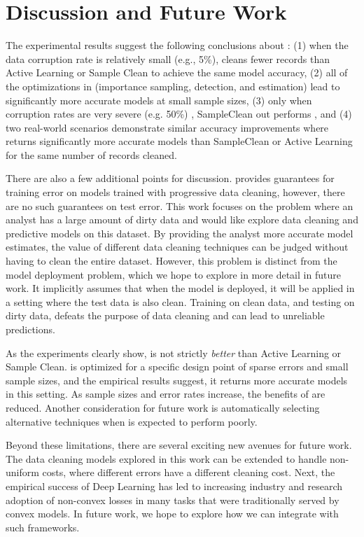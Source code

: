 \section{Discussion and Future Work}
The experimental results suggest the following conclusions about \sys: (1) when the data corruption rate is relatively small (e.g., 5\%), \sys cleans fewer records than Active Learning or Sample Clean to achieve the same model accuracy, (2) all of the optimizations in \sys (importance sampling, detection, and estimation) lead to significantly more accurate models at small sample sizes, (3) only when corruption rates are very severe (e.g. 50\%) , SampleClean out performs \sys, and (4) two real-world scenarios demonstrate similar accuracy improvements where \sys returns significantly more accurate models than SampleClean or Active Learning for the same number of records cleaned.

There are also a few additional points for discussion.
\sys provides guarantees for training error on models trained with progressive data cleaning, however, there are no such guarantees on test error. 
This work focuses on the problem where an analyst has a large amount of dirty data and would like explore data cleaning and predictive models on this dataset.
By providing the analyst more accurate model estimates, the value of different data cleaning techniques can be judged without having to clean the entire dataset.
However, this problem is distinct from the model deployment problem, which we hope to explore in more detail in future work.
It implicitly assumes that when the model is deployed, it will be applied in a setting where the test data is also clean.
Training on clean data, and testing on dirty data, defeats the purpose of data cleaning and can lead to unreliable predictions.

As the experiments clearly show, \sys is not strictly \emph{better} than Active Learning or Sample Clean.
\sys is optimized for a specific design point of sparse errors and small sample sizes, and the empirical results suggest, it returns more accurate models in this setting.
As sample sizes and error rates increase, the benefits of \sys are reduced.
Another consideration for future work is automatically selecting alternative techniques when \sys is expected to perform poorly.

Beyond these limitations, there are several exciting new avenues for future work.
The data cleaning models explored in this work can be extended to handle non-uniform costs, where different errors have a different cleaning cost.
Next, the empirical success of Deep Learning has led to increasing industry and research adoption of non-convex losses in many tasks that were traditionally served by convex models.
In future work, we hope to explore how we can integrate with such frameworks.

